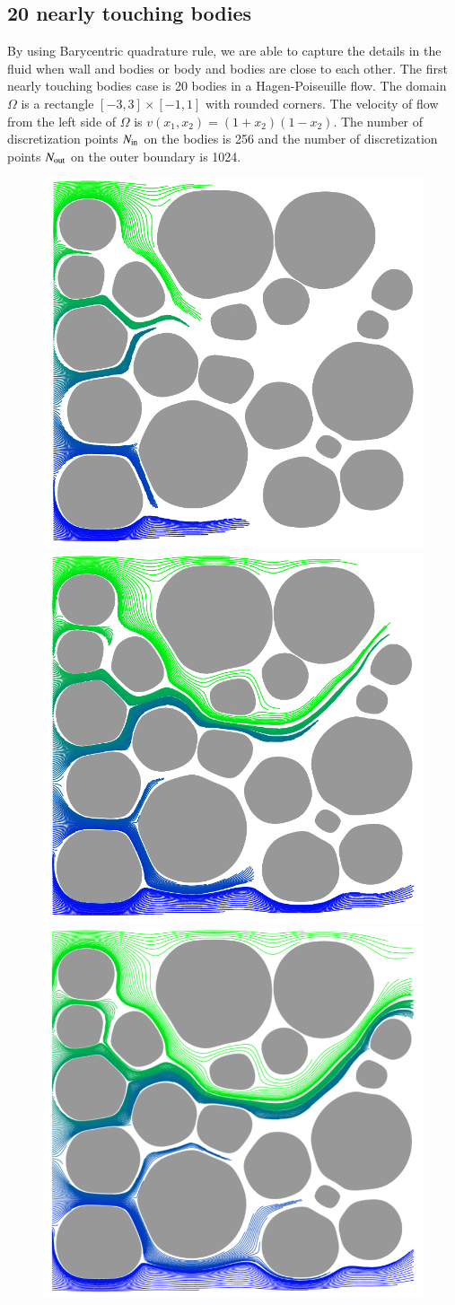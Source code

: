 \documentclass[preprint, 10pt]{elsarticle}
\begin{document}
\subsection{20 nearly touching bodies}
{\color{red} 
By using Barycentric quadrature rule, we are able to capture the details in the fluid when wall and bodies or body and bodies are close to each other. The first nearly touching bodies case is 20 bodies in a Hagen-Poiseuille flow. The domain $\Omega$ is a rectangle $[-3,3]\times[-1,1]$ with rounded corners. The velocity of flow from the left side of $\Omega$ is $v(x_1,x_2)=(1+x_2)(1-x_2)$. The number of discretization points $N_{\mathrm{in}}$ on the bodies is 256 and the number of discretization points $N_{\mathrm{out}}$ on the outer boundary is 1024. 
}

\begin{figure}[H]
\begin{center}
\includegraphics[width = 0.3 \textwidth]{./figs/tracer_20b30}
\includegraphics[width = 0.3 \textwidth]{./figs/tracer_20b60}
\includegraphics[width = 0.3 \textwidth]{./figs/tracer_20b90}\\


\end{center}
\end{figure}
\end{document}
